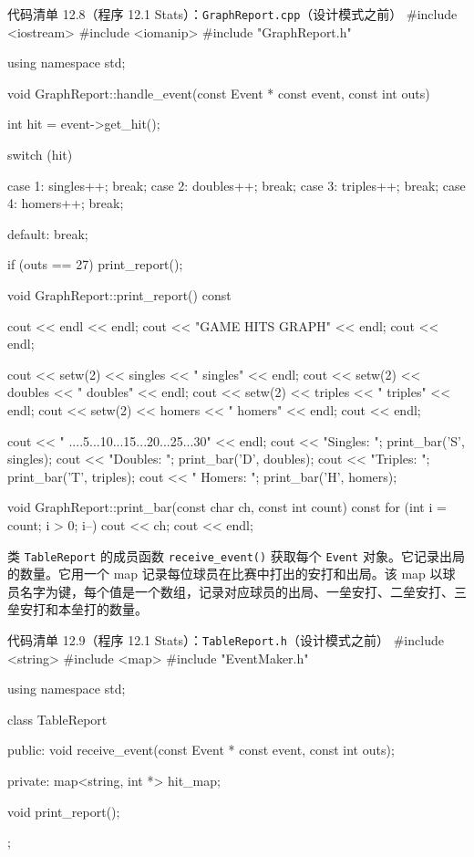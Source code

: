\begin{codeboxt}{代码清单 12.8（程序 12.1 Stats）：\texttt{Graph\allowbreak{}Report.\allowbreak{}cpp}（设计模式之前）}
#include <iostream>
#include <iomanip>
#include "GraphReport.h"

using namespace std;

void GraphReport::handle_event(const Event * const event, 
                               const int outs)
{
    int hit = event->get_hit();

    switch (hit)
    {
        case 1: singles++; break;
        case 2: doubles++; break;
        case 3: triples++; break;
        case 4: homers++;  break;

        default: break;
    }

    if (outs == 27) print_report();
}

void GraphReport::print_report() const
{
    cout << endl << endl;
    cout << "GAME HITS GRAPH" << endl;
    cout << endl;

    cout << setw(2) << singles << " singles" << endl;
    cout << setw(2) << doubles << " doubles" << endl;
    cout << setw(2) << triples << " triples" << endl;
    cout << setw(2) << homers  << " homers"  << endl;
    cout << endl;

    cout << "         ....5...10...15...20...25...30" << endl;
    cout << "Singles: "; print_bar('S', singles);
    cout << "Doubles: "; print_bar('D', doubles);
    cout << "Triples: "; print_bar('T', triples);
    cout << " Homers: "; print_bar('H', homers);
}

void GraphReport::print_bar(const char ch, const int count) const
{
    for (int i = count; i > 0; i--) cout << ch;
    cout << endl;
}
\end{codeboxt}

类 \texttt{Table\allowbreak{}Report} 的成员函数 \texttt{receive\_\allowbreak{}event(\allowbreak{})\allowbreak{}} 获取每个 \texttt{Event} 对象。它记录出局的数量。它用一个 map 记录每位球员在比赛中打出的安打和出局。该 map 以球员名字为键，每个值是一个数组，记录对应球员的出局、一垒安打、二垒安打、三垒安打和本垒打的数量。

\begin{codeboxt}{代码清单 12.9（程序 12.1 Stats）：\texttt{Table\allowbreak{}Report.\allowbreak{}h}（设计模式之前）}
#include <string>
#include <map>
#include "EventMaker.h"

using namespace std;

class TableReport
{
public:
    void receive_event(const Event * const event, const int outs);

private:
    map<string, int *> hit_map;

    void print_report();
};
\end{codeboxt}

